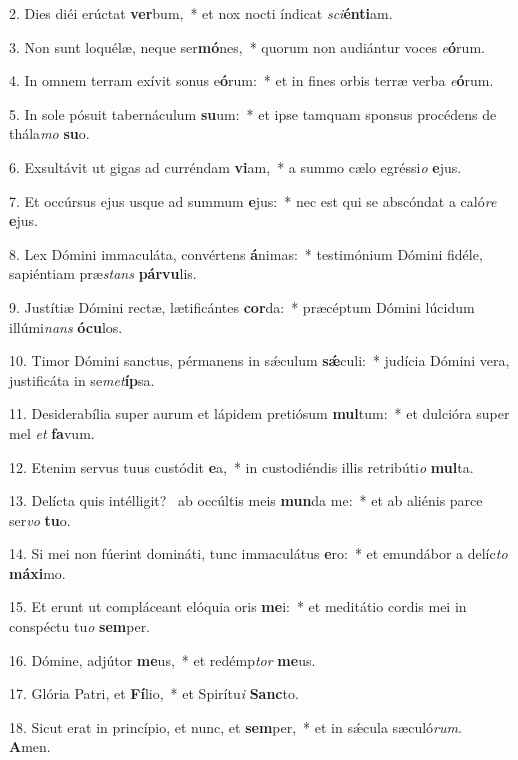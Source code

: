 2. Dies diéi erúctat \textbf{ver}bum,~*  et nox nocti índicat \textit{sci}\textbf{én}\textbf{ti}am.\

3. Non sunt loquélæ, neque ser\textbf{mó}nes,~*  quorum non audiántur voces \textit{e}\textbf{ó}rum.\

4. In omnem terram exívit sonus e\textbf{ó}rum:~*  et in fines orbis terræ verba \textit{e}\textbf{ó}rum.\

5. In sole pósuit tabernáculum \textbf{su}um:~*  et ipse tamquam sponsus procédens de thála\textit{mo} \textbf{su}o.\

6. Exsultávit ut gigas ad curréndam \textbf{vi}am,~*  a summo cælo egréssi\textit{o} \textbf{e}jus.\

7. Et occúrsus ejus usque ad summum \textbf{e}jus:~*  nec est qui se abscóndat a caló\textit{re} \textbf{e}jus.\

8. Lex Dómini immaculáta, convértens \textbf{á}nimas:~*  testimónium Dómini fidéle, sapiéntiam præ\textit{stans} \textbf{pár}\textbf{vu}lis.\

9. Justítiæ Dómini rectæ, lætificántes \textbf{cor}da:~*  præcéptum Dómini lúcidum illúmi\textit{nans} \textbf{ó}\textbf{cu}los.\

10. Timor Dómini sanctus, pérmanens in sǽculum \textbf{sǽ}culi:~*  judícia Dómini vera, justificáta in se\textit{met}\textbf{íp}sa.\

11. Desiderabília super aurum et lápidem pretiósum \textbf{mul}tum:~*  et dulcióra super mel \textit{et} \textbf{fa}vum.\

12. Etenim servus tuus custódit \textbf{e}a,~*  in custodiéndis illis retribúti\textit{o} \textbf{mul}ta.\

13. Delícta quis intélligit? \dag\  ab occúltis meis \textbf{mun}da me:~*  et ab aliénis parce ser\textit{vo} \textbf{tu}o.\

14. Si mei non fúerint domináti, tunc immaculátus \textbf{e}ro:~*  et emundábor a delíc\textit{to} \textbf{má}\textbf{xi}mo.\

15. Et erunt ut compláceant elóquia oris \textbf{me}i:~*  et meditátio cordis mei in conspéctu tu\textit{o} \textbf{sem}per.\

16. Dómine, adjútor \textbf{me}us,~*  et redémp\textit{tor} \textbf{me}us.\

17. Glória Patri, et \textbf{Fí}lio,~*  et Spirítu\textit{i} \textbf{Sanc}to.\

18. Sicut erat in princípio, et nunc, et \textbf{sem}per,~*  et in sǽcula sæculó\textit{rum}. \textbf{A}men.\

